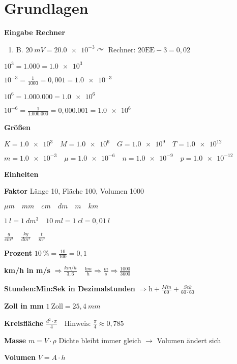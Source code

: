 \section{Grundlagen}\label{grundlagen}

\textbf{Eingabe Rechner}

\begin{enumerate}
\def\labelenumi{\alph{enumi}.}
\setcounter{enumi}{25}
\item
  B. $20~mV = \num{20,0e-3} \curvearrowright$ Rechner:
  $20\text{EE}-3 = 0,02$
\end{enumerate}

$10^3 = 1.000 = \num{1,0e3}$

$10^{-3} = \frac{1}{1000} = 0,001 = \num{1,0e-3}$

$10^6 = 1.000.000 = \num{1,0e6}$

$10^{-6} = \frac{1}{1.000.000} = 0,000.001 = \num{1,0e6}$

\textbf{Größen}

$\boxed{K = \num{1,0e3} \quad M = \num{1,0e6} \quad G = \num{1,0e9} \quad T = \num{1,0e12}}$

$\boxed{m = \num{1,0e-3} \quad \mu = \num{1,0e-6} \quad n = \num{1,0e-9} \quad p = \num{1,0e-12}}$

\textbf{Einheiten}

\textbf{Faktor} Länge 10, Fläche 100, Volumen 1000

$\boxed{\mu m \quad mm \quad cm \quad dm \quad m \quad km}$

$1~l = 1~dm^3 \quad 10~ml = 1~cl = 0,01~l$

$\frac{g}{cm^3} \quad \frac{kg}{dm^3} \quad \frac{t}{m^3}$

\textbf{Prozent} $10~\% = \frac{10}{100} = 0,1$

\textbf{km/h in m/s}
$\Rightarrow \frac{km/h}{3,6} \quad \frac{km}{h} \Rightarrow \frac{m}{s} \Rightarrow \frac{1000}{3600}$

\textbf{Stunden:Min:Sek in Dezimalstunden}
$\Rightarrow \text{h} + \frac{Min}{60} + \frac{Sek}{60 \cdot 60}$

\textbf{Zoll in mm} $1~\text{Zoll} = 25,4~mm$

\textbf{Kreisfläche}
$\boxed{\frac{d^2 \cdot \pi}{4}} \quad \text{Hinweis: }\frac{\pi}{4} \approx 0,785$

\textbf{Masse} $\boxed{m = V \cdot \rho}$ Dichte bleibt immer gleich
$\to$ Volumen ändert sich

\textbf{Volumen} $\boxed{V = A \cdot h}$

